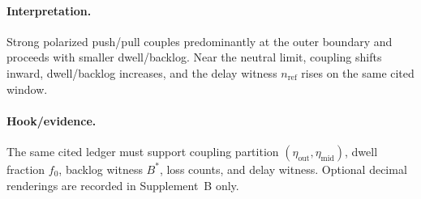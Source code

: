 \paragraph{Interpretation.} Strong polarized push/pull couples predominantly at the outer boundary and proceeds with smaller dwell/backlog. Near the neutral limit, coupling shifts inward, dwell/backlog increases, and the delay witness $n_{\mathrm{ref}}$ rises on the same cited window.
\paragraph{Hook/evidence.} The same cited ledger must support coupling partition $(\eta_{\mathrm{out}},\eta_{\mathrm{mid}})$, dwell fraction $f_0$, backlog witness $B^*$, loss counts, and delay witness. Optional decimal renderings are recorded in Supplement~B only.
